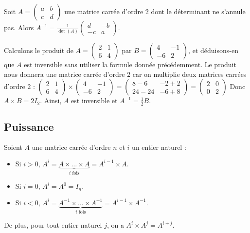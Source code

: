 	\begin{formula}
		Soit $\displaystyle{A = \begin{pmatrix} a & b \\ c & d \end{pmatrix}}$ une matrice carrée d'ordre $2$ dont le déterminant ne s'annule pas.
		\newpar
		Alors $\displaystyle{A^{-1} = \frac{1}{\det(A)} \begin{pmatrix} d & -b \\ -c & a \end{pmatrix}}$.
	\end{formula}

	\begin{tip}[Exemple]
		Calculons le produit de $\displaystyle{A = \begin{pmatrix}2 & 1 \\ 6 & 4\end{pmatrix}}$ par $\displaystyle{B = \begin{pmatrix}4 & -1 \\ -6 & 2\end{pmatrix}}$, et déduisons-en que $A$ est inversible sans utiliser la formule donnée précédemment.
		\newpar
		Le produit nous donnera une matrice carrée d'ordre $2$ car on multiplie deux matrices carrées d'ordre $2$ :
		\newpar
		$\displaystyle{\begin{pmatrix} 2 & 1 \\ 6 & 4 \end{pmatrix} \times \begin{pmatrix} 4 & -1 \\ -6 & 2\end{pmatrix} = \begin{pmatrix}8-6 & -2+2 \\ 24-24 & -6+8 \end{pmatrix} = \begin{pmatrix} 2 & 0 \\ 0 & 2 \end{pmatrix}}$
		\newpar
		Donc $A \times B = 2I_2$. Ainsi, $A$ est inversible et $A^{-1} = \frac{1}{2} B$.
	\end{tip}

	\subsection{Puissance}

	\begin{formula}
		Soient $A$ une matrice carrée d'ordre $n$ et $i$ un entier naturel :
		\begin{itemize}
			\item Si $i > 0$, $\displaystyle{A^i = \underbrace{A \times \dots \times A}_{i \text{ fois}} = A^{i-1} \times A}$.
			\item Si $i = 0$, $A^i = A^0 = I_n$.
			\item Si $i < 0$, $\displaystyle{A^i = \underbrace{A^{-1} \times \dots \times A^{-1}}_{i \text{ fois}} = A^{i-1} \times A^{-1}}$.
		\end{itemize}
		De plus, pour tout entier naturel $j$, on a $A^i \times A^j = A^{i+j}$.
	\end{formula}


